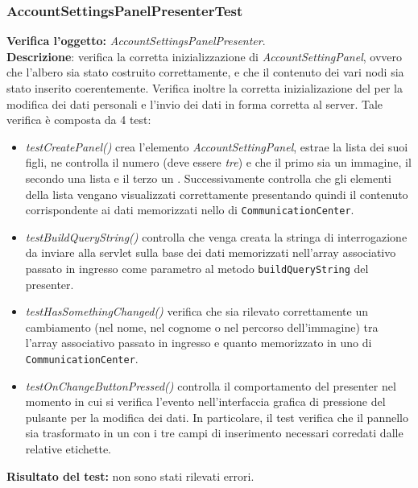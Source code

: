 \subsubsection{AccountSettingsPanelPresenterTest}
\textbf{Verifica l'oggetto:} \textit{AccountSettingsPanelPresenter}.\\
\textbf{Descrizione}: verifica la corretta inizializzazione di \textit{AccountSettingPanel}, ovvero che l'albero sia stato costruito correttamente, e che il contenuto dei vari nodi sia stato inserito coerentemente. Verifica inoltre la corretta inizializazione del  per la modifica dei dati personali e l'invio dei dati in forma corretta al server.
Tale verifica è composta da 4 test:
\begin{itemize}
\item \textit{testCreatePanel()} crea l'elemento \textit{AccountSettingPanel}, estrae la lista dei suoi figli, ne controlla il numero (deve essere \textit{tre}) e che il primo sia un immagine, il secondo una lista e il terzo un .
Successivamente controlla che gli elementi della lista vengano visualizzati correttamente presentando quindi il contenuto corrispondente ai dati memorizzati nello  di \texttt{CommunicationCenter}.
\item \textit{testBuildQueryString()} controlla che venga creata la stringa di interrogazione da inviare alla servlet sulla base dei dati memorizzati nell'array associativo passato in ingresso come parametro al metodo \texttt{buildQueryString} del presenter.
\item \textit{testHasSomethingChanged()} verifica che sia rilevato correttamente un cambiamento (nel nome, nel cognome o nel percorso dell'immagine) tra l'array associativo passato in ingresso e quanto memorizzato in uno  di \texttt{CommunicationCenter}.
\item \textit{testOnChangeButtonPressed()} controlla il comportamento del presenter nel momento in cui si verifica l'evento nell'interfaccia grafica di pressione del pulsante per la modifica dei dati. In particolare, il test verifica che il pannello sia trasformato in un  con i tre campi di inserimento necessari corredati dalle relative etichette.
\end{itemize}
\textbf{Risultato del test:} non sono stati rilevati errori.

